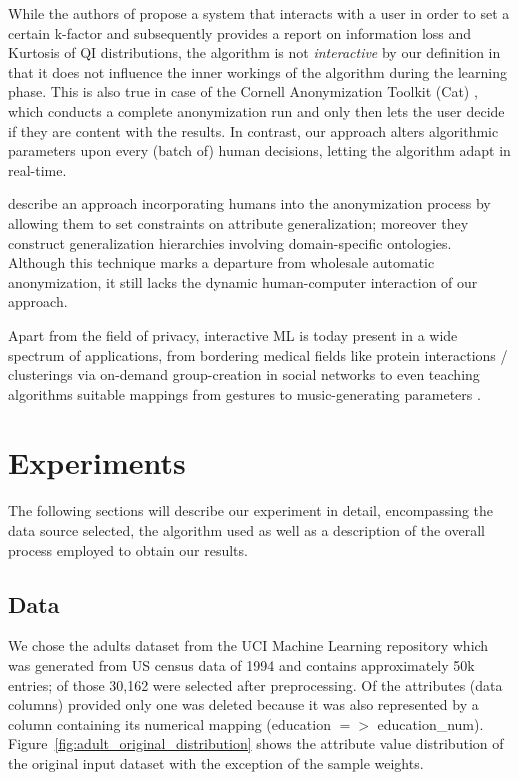\documentclass{llncs}
\begin{document}
While the authors of \cite{Moque2012} propose a system that interacts with a user in order to set a certain k-factor and subsequently provides a report on information loss and Kurtosis of QI distributions, the algorithm is not \textit{interactive} by our definition in that it does not influence the inner workings of the algorithm during the learning phase. This is also true in case of the Cornell Anonymization Toolkit (Cat) \cite{Xiao2009}, which conducts a complete anonymization run and only then lets the user decide if they are content with the results. In contrast, our approach alters algorithmic parameters upon every (batch of) human decisions, letting the algorithm adapt in real-time.

\cite{Loh2010} describe an approach incorporating humans into the anonymization process by allowing them to set constraints on attribute generalization; moreover they construct generalization hierarchies involving domain-specific ontologies. Although this technique marks a departure from wholesale automatic anonymization, it still lacks the dynamic human-computer interaction of our approach.

Apart from the field of privacy, interactive ML is today present in a wide spectrum of applications, from bordering medical fields like protein interactions / clusterings \cite{Amershi2014} via on-demand group-creation in social networks \cite{Amershi2012} to even teaching algorithms suitable mappings from gestures to music-generating parameters \cite{Fiebrink2009}.


\section{Experiments}
\label{sect:experiments}

The following sections will describe our experiment in detail, encompassing the data source selected, the algorithm used as well as a description of the overall process employed to obtain our results.


\subsection{Data} 
\label{ssect:data}

We chose the adults dataset from the UCI Machine Learning repository which was generated from US census data of 1994 and contains approximately 50k entries; of those 30,162 were selected after preprocessing. Of the attributes (data columns) provided only one was deleted because it was also represented by a column containing its numerical mapping (education $=>$ education\_num). Figure~\ref{fig:adult_original_distribution} shows the attribute value distribution of the original input dataset with the exception of the sample weights.
\end{document}
